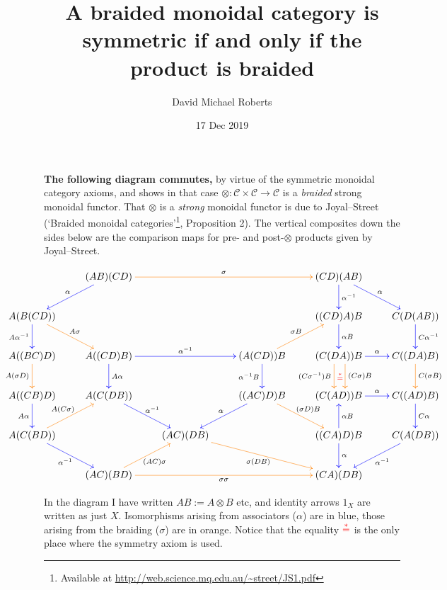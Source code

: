 \documentclass{amsart}
\begin{document}
\title{A braided monoidal category is symmetric if and only if the product is braided}
\author{David Michael Roberts}
\date{17 Dec 2019}

\maketitle

\noindent
\textbf{The following diagram commutes,} by virtue of the symmetric monoidal category axioms, and shows in that case $\otimes\colon \mathcal{C} \times \mathcal{C} \to \mathcal{C}$ is a \emph{braided} strong monoidal functor. That $\otimes$ is a \emph{strong} monoidal functor is due to Joyal--Street (`Braided monoidal categories'\footnote{Available at \url{http://web.science.mq.edu.au/~street/JS1.pdf}}, Proposition 2). The vertical composites down the sides below are the comparison maps for pre- and post-$\otimes$ products given by Joyal--Street.

\[\centerline{
	\xymatrix{
	 & (AB)(CD) \ar@[orange][rrr]^\sigma \ar@[blue][dl]_\alpha
	&&&
	\ar@[blue][dr]^\alpha (CD)(AB) \ar@[blue][d]^{\alpha^{-1}}& 
	\\
	A(B(CD))\ar@[blue][d]_{A\alpha^{-1}} \ar@[orange][dr]^{A\sigma}& 
	&
	& 
	&
	((CD)A)B \ar@[blue][d]^{\alpha B}  & 
	C(D(AB)) \ar@[blue][d]^{C\alpha^{-1}}\\
	A((BC)D)\ar@[orange][d]_{A(\sigma D)}&
	A((CD)B)\ar@[blue][d]^{A\alpha} \ar@[blue][rr]^{\alpha^{-1}}&&
	(A(CD))B\ar@[blue][d]_{\alpha^{-1}B} \ar@[orange][ur]^{\sigma B}& 
	(C(DA))B \ar@[orange]@<1.5ex>[d]^{(C\sigma)B} 
		\ar@[orange]@<-1.1ex>[d]^{\color{red}\stackrel{\ast}{=}}_{(C\sigma^{-1})B} 
		\ar@[blue][r]^\alpha &
	C((DA)B) \ar@[orange][d]^{C(\sigma B)}\\
	A((CB)D)\ar@[blue][d]_{A\alpha}&
	A(C(DB))\ar@[blue][dr]^{\alpha^{-1}}&&
	((AC)D)B \ar@[blue][dl]_\alpha \ar@[orange][dr]^{(\sigma D)B}& 
	(C(AD))B \ar@[blue][r]^\alpha& C((AD)B)\ar@[blue][d]^{C\alpha}\\
	A(C(BD))\ar@[blue][dr]_{\alpha^{-1}}\ar@[orange][ur]^{A(C\sigma)}&
	 & (AC)(DB)\ar@[orange][drr]_{\sigma(DB)} & 
	 &
	((CA)D)B \ar@[blue][d]^\alpha \ar@[blue][u]_{\alpha B}& 
	C(A(DB))\ar@[blue][dl]^{\alpha^{-1}}\\
	 &(AC)(BD)\ar@[orange][rrr]_{\sigma \sigma} \ar@[orange][ur]_{(AC)\sigma} 
	&&&(CA)(DB)&  
	}
	}
\]

\noindent
In the diagram I have written $AB:= A\otimes B$ etc, and identity arrows $1_X$ are written as just $X$. 
Isomorphisms arising from associators ($\alpha$) are in blue, those arising from the braiding ($\sigma$) are in orange.
Notice that the equality $\color{red}\stackrel{\ast}{=}$ is the only place where the symmetry axiom is used.
\end{document}
